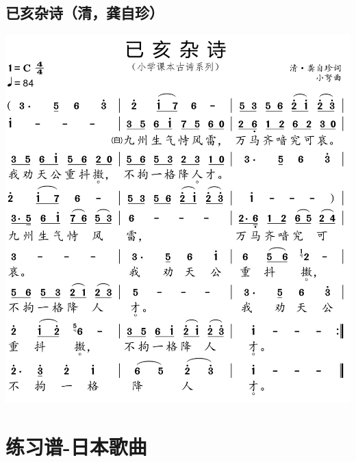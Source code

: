 \documentclass[cn,pad,chinesefont=nofont,twocol]{elegantbook}
\begin{document}
\section{已亥杂诗（清，龚自珍）}
    \includegraphics[width=\textwidth]{dongxiao/20200627-古诗-龚自珍-已亥杂诗.jpg}   

\chapter{练习谱-日本歌曲}
\end{document}
